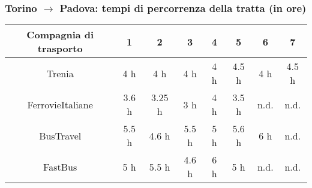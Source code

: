\documentclass[main.tex]{subfiles}
\begin{document}
\subsubsection*{Torino $\rightarrow$ Padova: tempi di percorrenza della tratta (in ore)}
{
\renewcommand{\arraystretch}{2}
\begin{longtable}[h]{c | c | c | c | c | c | c | c}
\textbf{Compagnia di trasporto} & \textbf{1} & \textbf{2} & \textbf{3} & \textbf{4} & \textbf{5} & \textbf{6} & \textbf{7} \\
\hline
\endhead
Trenia                          & 4 h        & 4 h        & 4 h        & 4 h        & 4.5 h      & 4 h        & 4.5 h      \\
\hline
FerrovieItaliane                & 3.6 h      & 3.25 h     & 3 h        & 4 h        & 3.5 h      & n.d.       & n.d.       \\
\hline
BusTravel                       & 5.5 h      & 4.6 h      & 5.5 h      & 5 h        & 5.6 h      & 6 h        & n.d.       \\
\hline
FastBus                         & 5 h        & 5.5 h      & 4.6 h      & 6 h        & 5 h        & n.d.       & n.d.       \\
\end{longtable}
}
\end{document}
